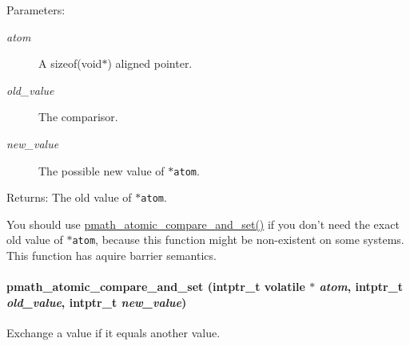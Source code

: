 \begin{Desc}
\item[Parameters:]
\begin{description}
\item[{\em atom}]A sizeof(void$\ast$) aligned pointer. \item[{\em old\_\-value}]The comparisor. \item[{\em new\_\-value}]The possible new value of {\tt $\ast$atom}. \end{description}
\end{Desc}
\begin{Desc}
\item[Returns:]The old value of {\tt $\ast$atom}.\end{Desc}
You should use \hyperlink{group__atomic__ops_g8e2ec6134e5f1161aed5c890abb2e53b}{pmath\_\-atomic\_\-compare\_\-and\_\-set()} if you don't need the exact old value of {\tt $\ast$atom}, because this function might be non-existent on some systems. This function has aquire barrier semantics. \hypertarget{group__atomic__ops_g8e2ec6134e5f1161aed5c890abb2e53b}{
\paragraph[{pmath\_\-atomic\_\-compare\_\-and\_\-set}]{ pmath\_\-atomic\_\-compare\_\-and\_\-set (intptr\_\-t volatile $\ast$ {\em atom}, \/  intptr\_\-t {\em old\_\-value}, \/  intptr\_\-t {\em new\_\-value})}\hfill}
\label{group__atomic__ops_g8e2ec6134e5f1161aed5c890abb2e53b}


Exchange a value if it equals another value. 

